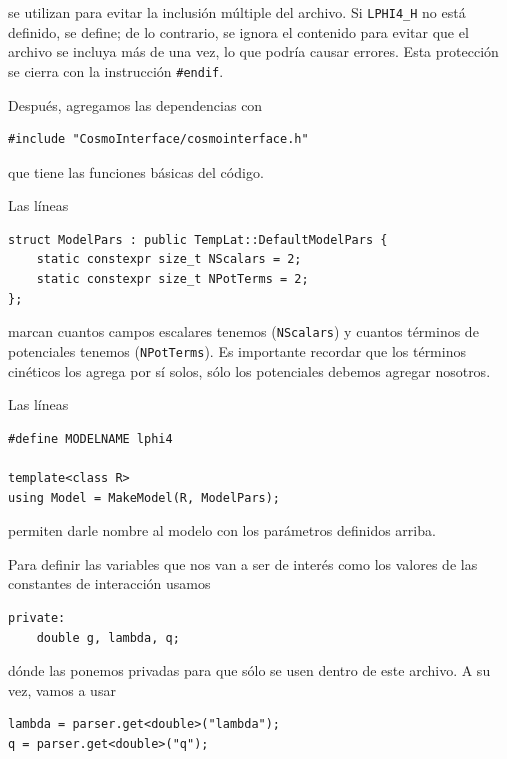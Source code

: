\noindent
se utilizan para evitar la inclusión múltiple del archivo. Si \texttt{LPHI4\_H} no está definido, se define; de lo contrario, se ignora el contenido para evitar que el archivo se incluya más de una vez, lo que podría causar errores. Esta protección se cierra con la instrucción \texttt{\#endif}.

Después, agregamos las dependencias con

\begin{lstlisting}[style = cppStyle]
#include "CosmoInterface/cosmointerface.h"
\end{lstlisting}

\noindent
que tiene las funciones básicas del código.

Las líneas

\begin{lstlisting}[style = cppStyle]
struct ModelPars : public TempLat::DefaultModelPars {
    static constexpr size_t NScalars = 2;
    static constexpr size_t NPotTerms = 2;
};
\end{lstlisting}

\noindent
marcan cuantos campos escalares tenemos (\texttt{NScalars}) y cuantos términos de potenciales tenemos (\texttt{NPotTerms}). Es importante recordar que los términos cinéticos los agrega por sí solos, sólo los potenciales debemos agregar nosotros.

Las líneas

\begin{lstlisting}[style = cppStyle]
#define MODELNAME lphi4

template<class R> 
using Model = MakeModel(R, ModelPars);
\end{lstlisting}

\noindent
permiten darle nombre al modelo con los parámetros definidos arriba.

Para definir las variables que nos van a ser de interés como los valores de las constantes de interacción usamos

\begin{lstlisting}[style = cppStyle]
private:
    double g, lambda, q;
\end{lstlisting}

\noindent
dónde las ponemos privadas para que sólo se usen dentro de este archivo. A su vez, vamos a usar

\begin{lstlisting}[style = cppStyle]
lambda = parser.get<double>("lambda");
q = parser.get<double>("q");
\end{lstlisting}

